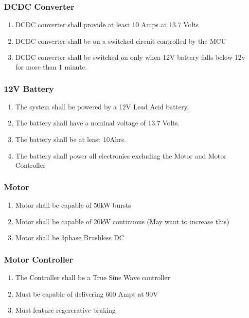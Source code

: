 \documentclass[12pt compsoc]{article}
\begin{document}
\subsubsection{DCDC Converter}
\begin{enumerate}
\item DCDC converter shall provide at least 10 Amps at 13.7 Volts
\item DCDC converter shall be on a switched circuit controlled by the MCU
\item DCDC converter shall be switched on only when 12V battery falls below 12v for more than 1 minute.
\end{enumerate}

\subsubsection{12V Battery}
\begin{enumerate}
\item The system shall be powered by a 12V Lead Acid battery.
\item The battery shall have a nominal voltage of 13.7 Volts.
\item The battery shall be at least 10Ahrs.
\item The battery shall power all electronics excluding the Motor and Motor Controller
\end{enumerate}

\subsubsection{Motor}
\begin{enumerate}
\item Motor shall be capable of 50kW bursts
\item Motor shall be capable of 20kW continuous (May want to increase this)
\item Motor shall be 3phase Brushless DC
\end{enumerate}

\subsubsection{Motor Controller}
\begin{enumerate}
\item The Controller shall be a True Sine Wave controller
\item Must be capable of delivering 600 Amps at 90V
\item Must feature regererative braking
\end{enumerate}
\end{document}
